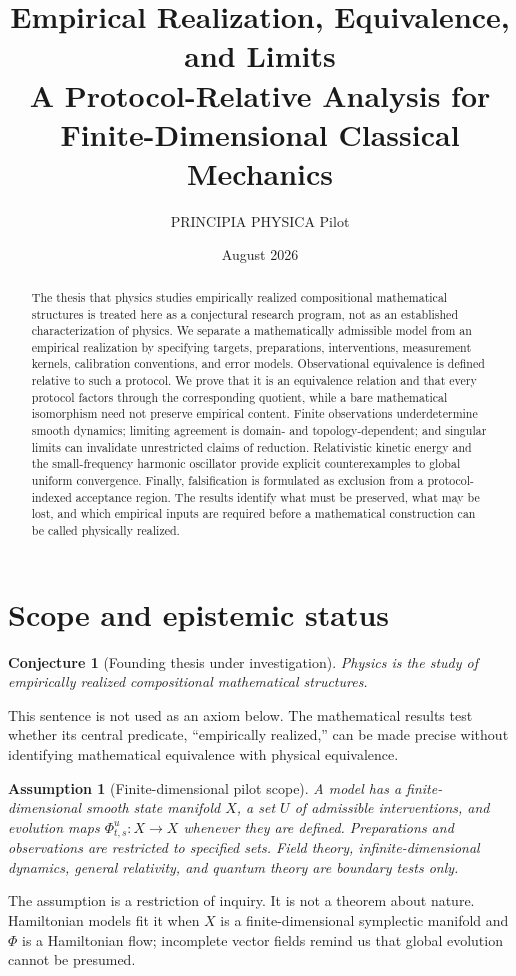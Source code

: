 \documentclass[11pt]{article}
\title{Empirical Realization, Equivalence, and Limits\\
\large A Protocol-Relative Analysis for Finite-Dimensional Classical Mechanics}
\author{PRINCIPIA PHYSICA Pilot}
\date{August 2026}
\newtheorem{assumption}[definition]{Assumption}
\newtheorem{conjecture}[definition]{Conjecture}
\theoremstyle{remark}
\begin{document}
\maketitle

\begin{abstract}
The thesis that physics studies empirically realized compositional mathematical structures is treated here as a conjectural research program, not as an established characterization of physics.  We separate a mathematically admissible model from an empirical realization by specifying targets, preparations, interventions, measurement kernels, calibration conventions, and error models.  Observational equivalence is defined relative to such a protocol.  We prove that it is an equivalence relation and that every protocol factors through the corresponding quotient, while a bare mathematical isomorphism need not preserve empirical content.  Finite observations underdetermine smooth dynamics; limiting agreement is domain- and topology-dependent; and singular limits can invalidate unrestricted claims of reduction.  Relativistic kinetic energy and the small-frequency harmonic oscillator provide explicit counterexamples to global uniform convergence.  Finally, falsification is formulated as exclusion from a protocol-indexed acceptance region.  The results identify what must be preserved, what may be lost, and which empirical inputs are required before a mathematical construction can be called physically realized.
\end{abstract}

\section{Scope and epistemic status}

\begin{conjecture}[Founding thesis under investigation]
Physics is the study of empirically realized compositional mathematical structures.
\end{conjecture}
This sentence is not used as an axiom below.  The mathematical results test whether its central predicate, ``empirically realized,'' can be made precise without identifying mathematical equivalence with physical equivalence.

\begin{assumption}[Finite-dimensional pilot scope]\label{ass:scope}
A model has a finite-dimensional smooth state manifold $X$, a set $U$ of admissible interventions, and evolution maps $\Phi^u_{t,s}:X\to X$ whenever they are defined.  Preparations and observations are restricted to specified sets.  Field theory, infinite-dimensional dynamics, general relativity, and quantum theory are boundary tests only.
\end{assumption}
The assumption is a restriction of inquiry.  It is not a theorem about nature.  Hamiltonian models fit it when $X$ is a finite-dimensional symplectic manifold and $\Phi$ is a Hamiltonian flow; incomplete vector fields remind us that global evolution cannot be presumed.
\end{document}
